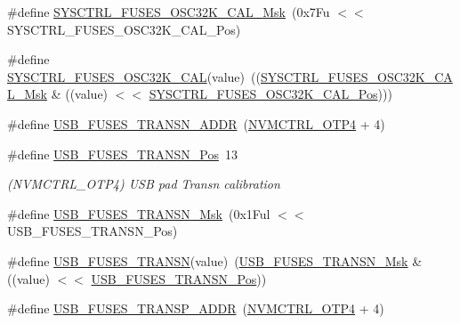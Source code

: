 \begin{DoxyCompactItemize}
\#define \mbox{\hyperlink{group__fuses__api_gab6daf533ef5ae7a2694f77bdcdf4a785}{S\+Y\+S\+C\+T\+R\+L\+\_\+\+F\+U\+S\+E\+S\+\_\+\+O\+S\+C32\+K\+\_\+\+C\+A\+L\+\_\+\+Msk}}~(0x7\+Fu $<$$<$ S\+Y\+S\+C\+T\+R\+L\+\_\+\+F\+U\+S\+E\+S\+\_\+\+O\+S\+C32\+K\+\_\+\+C\+A\+L\+\_\+\+Pos)
\item 
\#define \mbox{\hyperlink{group__fuses__api_ga552f448ff891f606d6c7fd2ab8f80d7e}{S\+Y\+S\+C\+T\+R\+L\+\_\+\+F\+U\+S\+E\+S\+\_\+\+O\+S\+C32\+K\+\_\+\+C\+AL}}(value)~((\mbox{\hyperlink{group__fuses__api_gab6daf533ef5ae7a2694f77bdcdf4a785}{S\+Y\+S\+C\+T\+R\+L\+\_\+\+F\+U\+S\+E\+S\+\_\+\+O\+S\+C32\+K\+\_\+\+C\+A\+L\+\_\+\+Msk}} \& ((value) $<$$<$ \mbox{\hyperlink{group__fuses__api_gae742aeae0713fcc6db6fd3b9036250a9}{S\+Y\+S\+C\+T\+R\+L\+\_\+\+F\+U\+S\+E\+S\+\_\+\+O\+S\+C32\+K\+\_\+\+C\+A\+L\+\_\+\+Pos}})))
\item 
\#define \mbox{\hyperlink{group__fuses__api_gac987d8deebc5d8592e0a953fb5d1e9ac}{U\+S\+B\+\_\+\+F\+U\+S\+E\+S\+\_\+\+T\+R\+A\+N\+S\+N\+\_\+\+A\+D\+DR}}~(\mbox{\hyperlink{group___s_a_m_d21_j18_a__base_ga138b4aca5a0446a745fe143c1dca8165}{N\+V\+M\+C\+T\+R\+L\+\_\+\+O\+T\+P4}} + 4)
\item 
\#define \mbox{\hyperlink{group__fuses__api_gab0e7f93b7c247b3159128648a749719f}{U\+S\+B\+\_\+\+F\+U\+S\+E\+S\+\_\+\+T\+R\+A\+N\+S\+N\+\_\+\+Pos}}~13
\begin{DoxyCompactList}\small\item\em (N\+V\+M\+C\+T\+R\+L\+\_\+\+O\+T\+P4) U\+SB pad Transn calibration \end{DoxyCompactList}\item 
\#define \mbox{\hyperlink{group__fuses__api_ga34a4daed05b8db2ea3ad1cfcb0a15b47}{U\+S\+B\+\_\+\+F\+U\+S\+E\+S\+\_\+\+T\+R\+A\+N\+S\+N\+\_\+\+Msk}}~(0x1\+Ful $<$$<$ U\+S\+B\+\_\+\+F\+U\+S\+E\+S\+\_\+\+T\+R\+A\+N\+S\+N\+\_\+\+Pos)
\item 
\#define \mbox{\hyperlink{group__fuses__api_gaf1d4ce25c05cdd9ec50e268889839292}{U\+S\+B\+\_\+\+F\+U\+S\+E\+S\+\_\+\+T\+R\+A\+N\+SN}}(value)~(\mbox{\hyperlink{group__fuses__api_ga34a4daed05b8db2ea3ad1cfcb0a15b47}{U\+S\+B\+\_\+\+F\+U\+S\+E\+S\+\_\+\+T\+R\+A\+N\+S\+N\+\_\+\+Msk}} \& ((value) $<$$<$ \mbox{\hyperlink{group__fuses__api_gab0e7f93b7c247b3159128648a749719f}{U\+S\+B\+\_\+\+F\+U\+S\+E\+S\+\_\+\+T\+R\+A\+N\+S\+N\+\_\+\+Pos}}))
\item 
\#define \mbox{\hyperlink{group__fuses__api_ga9945c7615643af7f5a4b39ca14dcb5a8}{U\+S\+B\+\_\+\+F\+U\+S\+E\+S\+\_\+\+T\+R\+A\+N\+S\+P\+\_\+\+A\+D\+DR}}~(\mbox{\hyperlink{group___s_a_m_d21_j18_a__base_ga138b4aca5a0446a745fe143c1dca8165}{N\+V\+M\+C\+T\+R\+L\+\_\+\+O\+T\+P4}} + 4)

\end{DoxyCompactItemize}

